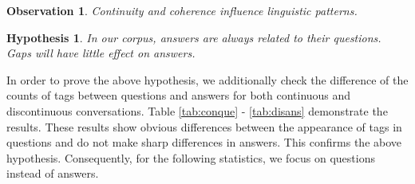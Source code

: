 \documentclass[bsc,frontabs,twoside,singlespacing,parskip,deptreport]{infthesis}     %
\newtheorem{observation}{Observation}[chapter]
\newtheorem{hypo}{Hypothesis}[chapter]
\begin{document}
\begin{observation}
Continuity and coherence influence linguistic patterns.
\end{observation} 

\begin{hypo}
In our corpus, answers are always related to their questions. Gaps will have little effect on answers.
\end{hypo}

In order to prove the above hypothesis, we additionally check the difference of the counts of tags between questions and answers for both continuous and discontinuous conversations. Table \ref{tab:conque} - \ref{tab:disans} demonstrate the results. These results show obvious differences between the appearance of tags in questions and do not make sharp differences in answers. This confirms the above hypothesis. Consequently, for the following statistics, we focus on questions instead of answers.
\end{document}
